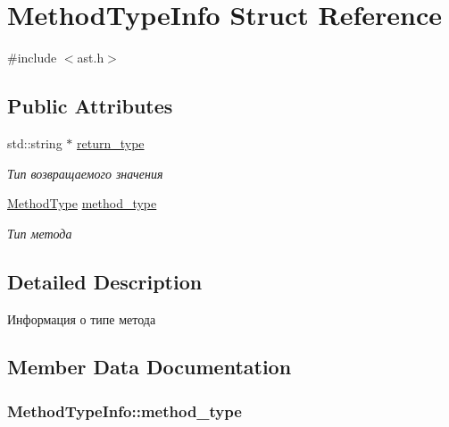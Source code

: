 \hypertarget{structMethodTypeInfo}{}\section{Method\+Type\+Info Struct Reference}
\label{structMethodTypeInfo}


{\ttfamily \#include $<$ast.\+h$>$}

\subsection*{Public Attributes}
\begin{DoxyCompactItemize}
\item 
std\+::string $\ast$ \hyperlink{structMethodTypeInfo_a4bd6ddafdf47413038f62af796fe816a}{return\+\_\+type}
\begin{DoxyCompactList}\small\item\em Тип возвращаемого значения \end{DoxyCompactList}\item 
\hyperlink{ast_8h_a3006a5b9309b36eaa1cf179f1478b0cd}{Method\+Type} \hyperlink{structMethodTypeInfo_a27d1fc69f1b76fd1b0958e0791dcc1e0}{method\+\_\+type}
\begin{DoxyCompactList}\small\item\em Тип метода \end{DoxyCompactList}\end{DoxyCompactItemize}


\subsection{Detailed Description}
Информация о типе метода 

\subsection{Member Data Documentation}
\hypertarget{structMethodTypeInfo_a27d1fc69f1b76fd1b0958e0791dcc1e0}{}
\subsubsection[{method\+\_\+type}]{ Method\+Type\+Info\+::method\+\_\+type}\label{structMethodTypeInfo_a27d1fc69f1b76fd1b0958e0791dcc1e0}


